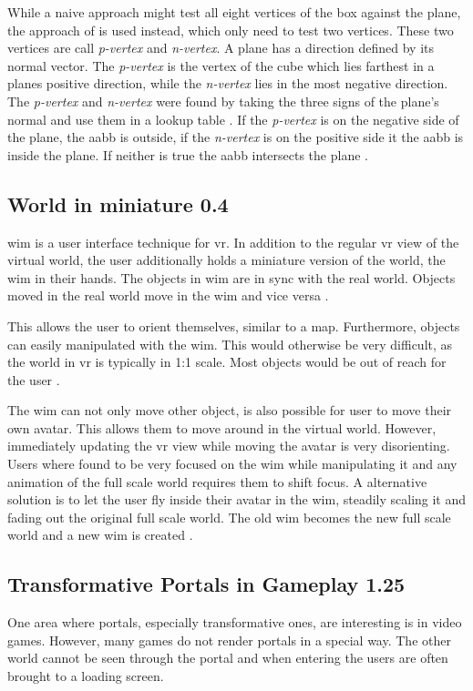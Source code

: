 While a naive approach might test all eight vertices of the box against the plane, the approach of \textcite{greene:1994:detecting} is used instead, which only need to test two vertices. These two vertices are call  \textit{p-vertex} and \textit{n-vertex}. A plane has a direction defined by its normal vector. The \textit{p-vertex} is the vertex of the cube which lies farthest in a planes positive direction, while the \textit{n-vertex} lies in the most negative direction. The \textit{p-vertex} and \textit{n-vertex} were found by taking the three signs of the plane's normal and use them in a lookup table \cite{assarsson:2000:optimized}. If the \textit{p-vertex} is on the negative side of the plane, the \gls{aabb} is outside, if the \textit{n-vertex} is on the positive side it the \gls{aabb} is inside the plane. If neither is true the \gls{aabb} intersects the plane \cite{greene:1994:detecting}.


\subsection{World in miniature 0.4}
\Gls{wim} is a user interface technique for \gls{vr}. In addition to the regular \gls{vr} view of the virtual world, the user additionally holds a miniature version of the world, the \gls{wim} in their hands. The objects in \gls{wim} are in sync with the real world. Objects moved in the real world move in the  \gls{wim} and vice versa \cite{stoakley:1995:virtual}. 

This allows the user to orient themselves, similar to a map. Furthermore, objects can easily manipulated with the \gls{wim}. This would otherwise be very difficult, as the world in \gls{vr} is typically in 1:1 scale. Most objects would be out of reach for the user \cite{stoakley:1995:virtual}.

The \gls{wim} can not only move other object, is also possible for user to move their own avatar. This allows them to move around in the virtual world. However, immediately updating the \gls{vr} view while moving the avatar is very disorienting. Users where found to be very focused on the \gls{wim} while manipulating it and any animation of the full scale world requires them to shift focus. A alternative solution is to let the user fly inside their avatar in the \gls{wim}, steadily scaling it and fading out the original full scale world. The old \gls{wim} becomes the new full scale world and a new \gls{wim} is created \cite{pausch:1995:navigation}.


\subsection{Transformative Portals in Gameplay 1.25}
One area where portals, especially transformative ones, are interesting is in video games. However, many games do not render portals in a special way. The other world cannot be seen through the portal and when entering the users are often brought to a loading screen. 

